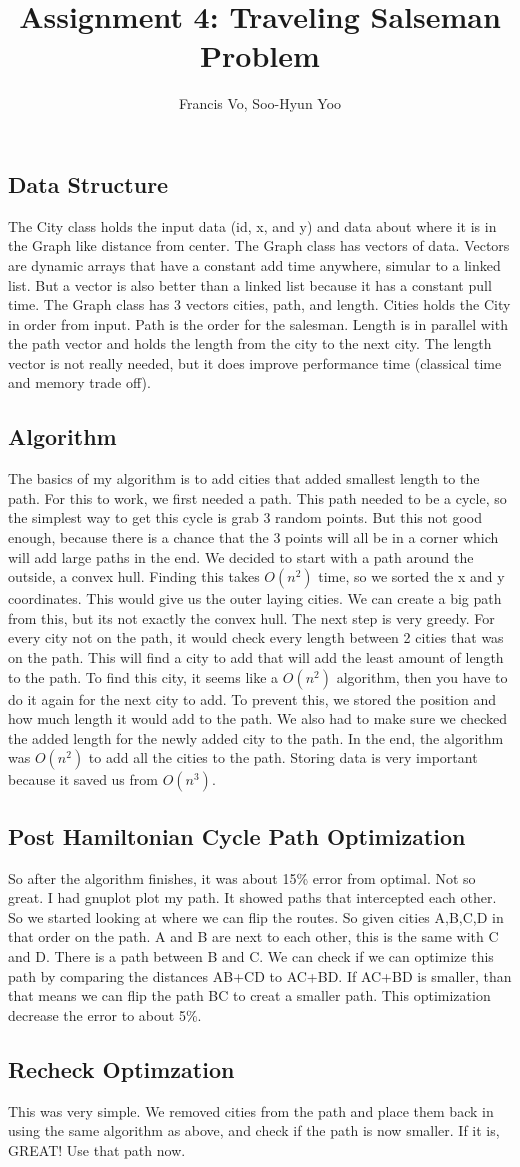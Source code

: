 \documentclass[letterpaper,10pt]{article}
\title{Assignment 4: Traveling Salseman Problem}
\author{Francis Vo, Soo-Hyun Yoo}
\begin{document}
	\subsection{Data Structure}
		The City class holds the input data (id, x, and y) and data about where it is in the Graph like distance from center. The Graph class has vectors of data. Vectors are dynamic arrays that have a constant add time anywhere, simular to a linked list.  But a vector is also better than a linked list because it has a constant pull time.  The Graph class has 3 vectors cities, path, and length.  Cities holds the City in order from input.  Path is the order for the salesman.  Length is in parallel with the path vector and holds the length from the city to the next city. The length vector is not really needed, but it does improve performance time (classical time and memory trade off). 

	\subsection{Algorithm}
		The basics of my algorithm is to add cities that added smallest length to the path.  For this to work, we first needed a path.  This path needed to be a cycle, so the simplest way to get this cycle is grab 3 random points.  But this not good enough, because there is a chance that the 3 points will all be in a corner which will add large paths in the end.  We decided to start with a path around the outside, a convex hull.  Finding this takes $O(n^2)$ time, so we sorted the x and y coordinates.  This would give us the outer laying cities. We can create a big path from this, but its not exactly the convex hull. The next step is very greedy. For every city not on the path, it would check every length between 2 cities that was on the path.  This will find a city to add that will add the least amount of length to the path.  To find this city, it seems like a $O(n^2)$ algorithm, then you have to do it again for the next city to add. To prevent this, we stored the position and how much length it would add to the path. We also had to make sure we checked the added length for the newly added city to the path.  In the end, the algorithm was $O(n^2)$ to add all the cities to the path.  Storing data is very important because it saved us from $O(n^3)$. 

	\subsection{Post Hamiltonian Cycle Path Optimization}
		So after the algorithm finishes, it was about 15\% error from optimal.  Not so great.  I had gnuplot plot my path.  It showed paths that intercepted each other.  So we started looking at where we can flip the routes.  So given cities A,B,C,D in that order on the path. A and B are next to each other, this is the same with C and D.  There is a path between B and C.  We can check if we can optimize this path by comparing the distances AB+CD to AC+BD.  If AC+BD is smaller, than that means we can flip the path BC to creat a smaller path.  This optimization decrease the error to about 5\%.

	\subsection{Recheck Optimzation}
		This was very simple. We removed cities from the path and place them back in using the same algorithm as above, and check if the path is now smaller. If it is, GREAT! Use that path now. 
\end{document}
